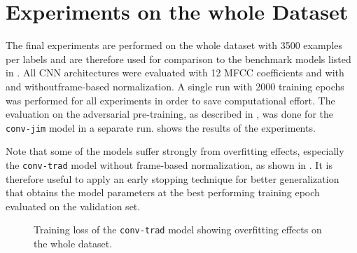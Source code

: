 
\section{Experiments on the whole Dataset}\label{sec:exp_final}
The final experiments are performed on the whole dataset with 3500 examples per labels and are therefore used for comparison to the benchmark models listed in .
All CNN architectures were evaluated with 12 MFCC coefficients and with and withoutframe-based normalization.
A single run with 2000 training epochs was performed for all experiments in order to save computational effort.
The evaluation on the adversarial pre-training, as described in , was done for the \texttt{conv-jim} model in a separate run.
 shows the results of the experiments.

Note that some of the models suffer strongly from overfitting effects, especially the \texttt{conv-trad} model without frame-based normalization, as shown in .
It is therefore useful to apply an early stopping technique for better generalization that obtains the model parameters at the best performing training epoch evaluated on the validation set.
\begin{figure}[!ht]
  \centering
  \quad
  \caption{Training loss of the \texttt{conv-trad} model showing overfitting effects on the whole dataset.}
  \label{fig:exp_final_loss_conv-trad}
\end{figure}
